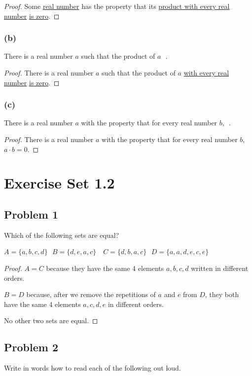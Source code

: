 \documentclass[14pt]{extarticle}
\newcommand{\fbl}{\underline{\hspace{1cm}}\,\,}
\begin{document}
\begin{proof}
    Some \underline{real number} has the property that its \underline{product with
        every real number} \underline{is zero}.
\end{proof}

\subsubsection{(b)}
There is a real number $a$ such that the product of $a$ \fbl.

\begin{proof}
    There is a real number $a$ such that the product of $a$ \underline{with every
        real number} \underline{is zero}.
\end{proof}

\subsubsection{(c)}
There is a real number $a$ with the property that for every real number $b$,
\fbl.

\begin{proof}
    There is a real number $a$ with the property that for every real number $b$,
    \underline{$a \cdot b = 0$}.
\end{proof}

\section{Exercise Set 1.2}

\subsection{Problem 1}
Which of the following sets are equal?

$A = \{a, b, c, d\} \,\,\,\, B = \{d, e, a, c\} \,\,\,\,$
$C = \{d, b, a, c\} \,\,\,\, D = \{a, a, d, e, c, e\}$

\begin{proof}
    $A = C$ because they have the same 4 elements $a, b, c, d$ written in different
    orders.

    $B = D$ because, after we remove the repetitions of $a$ and $e$ from $D$, they
    both have the same 4 elements $a, c, d, e$ in different orders.

    No other two sets are equal.
\end{proof}

\subsection{Problem 2}
Write in words how to read each of the following out loud.
\end{document}
